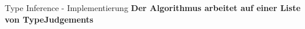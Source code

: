 {
  \begin{itemgroup}{Type Inference - Implementierung}
    \textbf{Der Algorithmus arbeitet auf einer Liste von TypeJudgements}
  \end{itemgroup}
}